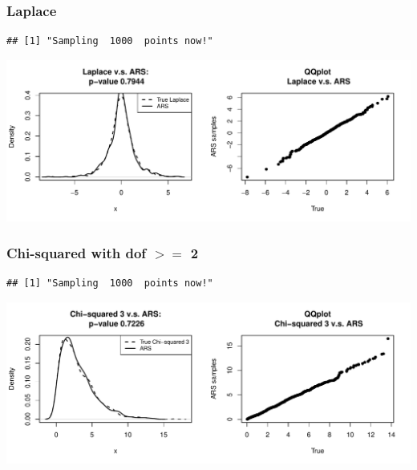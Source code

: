 \documentclass{article}\usepackage[]{graphicx}\usepackage[]{color}
\makeatletter
\def\maxwidth{ %
  \ifdim\Gin@nat@width>\linewidth
    \linewidth
  \else
    \Gin@nat@width
  \fi
}
\newenvironment{kframe}{%
 \def\at@end@of@kframe{}%
 \ifinner\ifhmode%
  \def\at@end@of@kframe{\end{minipage}}%
  \begin{minipage}{\columnwidth}%
 \fi\fi%
 \def\FrameCommand##1{\hskip\@totalleftmargin \hskip-\fboxsep
 \colorbox{shadecolor}{##1}\hskip-\fboxsep
     \hskip-\linewidth \hskip-\@totalleftmargin \hskip\columnwidth}%
 \MakeFramed {\advance\hsize-\width
   \@totalleftmargin\z@ \linewidth\hsize
   \@setminipage}}%
 {\par\unskip\endMakeFramed%
 \at@end@of@kframe}
\newenvironment{knitrout}{}{} %
\makeatother
\begin{document}
\subsubsection{Laplace}
\begin{knitrout}
\color{fgcolor}\begin{kframe}
\begin{verbatim}
## [1] "Sampling  1000  points now!"
\end{verbatim}
\end{kframe}
\includegraphics[width=\maxwidth]{figure/laplace-1} 

\end{knitrout}

\subsubsection{Chi-squared with dof $>=$ 2}
\begin{knitrout}
\color{fgcolor}\begin{kframe}
\begin{verbatim}
## [1] "Sampling  1000  points now!"
\end{verbatim}
\end{kframe}
\includegraphics[width=\maxwidth]{figure/chisq_3-1} 

\end{knitrout}
\end{document}
